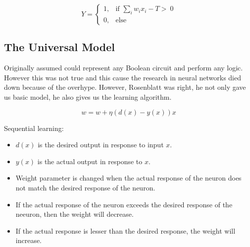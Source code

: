 \[ 
Y = 
\begin{cases} 
	1, & \text{if } \sum_{i}w_ix_i - T >\ 0 \\
	0, & \text{else }
\end{cases}
\]

\subsection{The Universal Model}
Originally assumed could represent any Boolean circuit and perform any logic. However this was not true and this cause the research in neural networks died down because of the overhype. However, Rosenblatt was right, he not only gave us basic model, he also gives us the learning algorithm.

\[ w = w + \eta (d(x) - y(x))x \]

Sequential learning:
\begin{itemize}
	\item $d(x)$ is the desired output in response to input $x$.
	\item $y(x)$ is the actual output in response to $x$.
	\item Weight parameter is changed when the actual response of the neuron does not match the desired response of the neuron.
	\item If the actual response of the neuron exceeds the desired response of the neeuron, then the weight will decrease.
	\item If the actual response is lesser than the desired response, the weight will increase.
\end{itemize}

